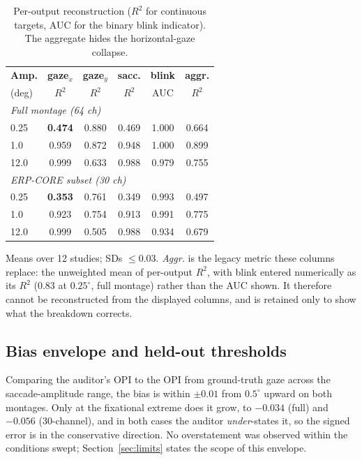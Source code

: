 \documentclass[conference]{IEEEtran}
\begin{document}
\begin{table}[!t]
\centering
\caption{Per-output reconstruction ($R^2$ for continuous targets, AUC for the binary blink
indicator). The aggregate hides the horizontal-gaze collapse.}\label{tab:peroutput}
\begin{threeparttable}
{\small
\begin{tabular*}{\columnwidth}{@{\extracolsep{\fill}} l cccc c @{}}
\toprule
\textbf{Amp.} & \textbf{gaze$_x$} & \textbf{gaze$_y$} & \textbf{sacc.} & \textbf{blink} &
\textbf{aggr.} \\
(deg) & $R^2$ & $R^2$ & $R^2$ & AUC & $R^2$ \\
\midrule
\multicolumn{6}{l}{\emph{Full montage (64 ch)}}\\
0.25 & \textbf{0.474} & 0.880 & 0.469 & 1.000 & 0.664 \\
1.0  & 0.959 & 0.872 & 0.948 & 1.000 & 0.899 \\
12.0 & 0.999 & 0.633 & 0.988 & 0.979 & 0.755 \\
\multicolumn{6}{l}{\emph{ERP-CORE subset (30 ch)}}\\
0.25 & \textbf{0.353} & 0.761 & 0.349 & 0.993 & 0.497 \\
1.0  & 0.923 & 0.754 & 0.913 & 0.991 & 0.775 \\
12.0 & 0.999 & 0.505 & 0.988 & 0.934 & 0.679 \\
\bottomrule
\end{tabular*}}
\begin{tablenotes}
\small
\item Means over 12 studies; SDs $\le0.03$. \emph{Aggr.} is the legacy metric these columns
replace: the unweighted mean of per-output $R^2$, with blink entered numerically as its $R^2$
($0.83$ at $0.25^\circ$, full montage) rather than the AUC shown. It therefore cannot be
reconstructed from the displayed columns, and is retained only to show what the breakdown
corrects.
\end{tablenotes}
\end{threeparttable}
\end{table}

\subsection{Bias envelope and held-out thresholds}\label{sec:thresh}

Comparing the auditor's OPI to the OPI from ground-truth gaze across the saccade-amplitude
range, the bias is within $\pm0.01$ from $0.5^\circ$ upward on both montages. Only at the
fixational extreme does it grow, to $-0.034$ (full) and $-0.056$ (30-channel), and in both cases
the auditor \emph{under}-states it, so the signed error is in the conservative direction. No
overstatement was observed
within the conditions swept; Section~\ref{sec:limits} states the scope of this envelope.
\end{document}
